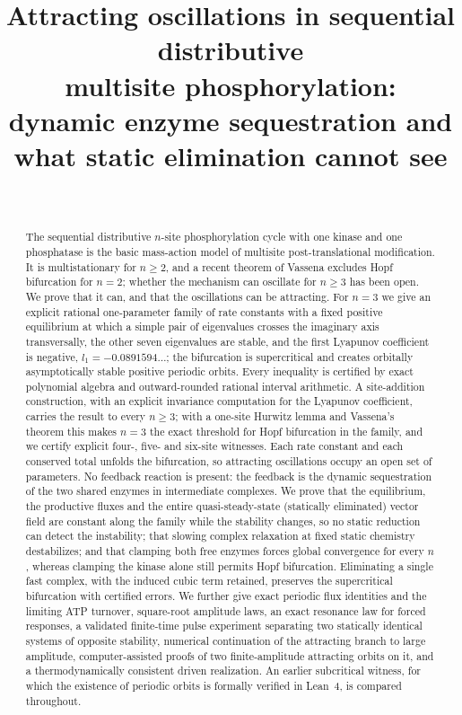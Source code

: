 \documentclass[11pt,a4paper]{article}
\title{Attracting oscillations in sequential distributive\\ multisite phosphorylation:\\[2pt]
\large dynamic enzyme sequestration and what static elimination cannot see}
\author{\PaperAuthor\\[2pt]\small\PaperAffiliation}
\date{\PaperDate}
\theoremstyle{plain}
\theoremstyle{definition}
\theoremstyle{remark}
\begin{document}
\maketitle

\begin{abstract}
The sequential distributive $n$-site phosphorylation cycle with one kinase and one phosphatase is the basic mass-action model of multisite post-translational modification. It is multistationary for $n\ge2$, and a recent theorem of Vassena excludes Hopf bifurcation for $n=2$; whether the mechanism can oscillate for $n\ge3$ has been open. We prove that it can, and that the oscillations can be attracting. For $n=3$ we give an explicit rational one-parameter family of rate constants with a fixed positive equilibrium at which a simple pair of eigenvalues crosses the imaginary axis transversally, the other seven eigenvalues are stable, and the first Lyapunov coefficient is negative, $l_1=-0.0891594\ldots$; the bifurcation is supercritical and creates orbitally asymptotically stable positive periodic orbits. Every inequality is certified by exact polynomial algebra and outward-rounded rational interval arithmetic. A site-addition construction, with an explicit invariance computation for the Lyapunov coefficient, carries the result to every $n\ge3$; with a one-site Hurwitz lemma and Vassena's theorem this makes $n=3$ the exact threshold for Hopf bifurcation in the family, and we certify explicit four-, five- and six-site witnesses. Each rate constant and each conserved total unfolds the bifurcation, so attracting oscillations occupy an open set of parameters. No feedback reaction is present: the feedback is the dynamic sequestration of the two shared enzymes in intermediate complexes. We prove that the equilibrium, the productive fluxes and the entire quasi-steady-state (statically eliminated) vector field are constant along the family while the stability changes, so no static reduction can detect the instability; that slowing complex relaxation at fixed static chemistry destabilizes; and that clamping both free enzymes forces global convergence for every $n$, whereas clamping the kinase alone still permits Hopf bifurcation. Eliminating a single fast complex, with the induced cubic term retained, preserves the supercritical bifurcation with certified errors. We further give exact periodic flux identities and the limiting ATP turnover, square-root amplitude laws, an exact resonance law for forced responses, a validated finite-time pulse experiment separating two statically identical systems of opposite stability, numerical continuation of the attracting branch to large amplitude, computer-assisted proofs of two finite-amplitude attracting orbits on it, and a thermodynamically consistent driven realization. An earlier subcritical witness, for which the existence of periodic orbits is formally verified in Lean~4, is compared throughout.
\end{abstract}
\end{document}

